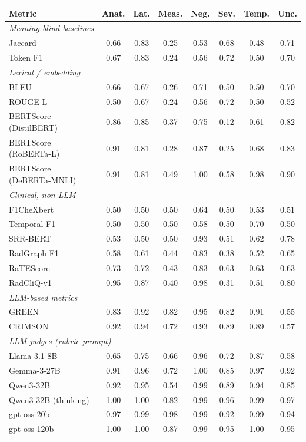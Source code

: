 \begin{tabular}{lccccccc}
\toprule
\textbf{Metric} & Anat. & Lat. & Meas. & Neg. & Sev. & Temp. & Unc. \\
\midrule
\multicolumn{8}{l}{\textit{Meaning-blind baselines}} \\
Jaccard & 0.66 & 0.83 & 0.25 & 0.53 & 0.68 & 0.48 & 0.71 \\
Token F1 & 0.67 & 0.83 & 0.24 & 0.56 & 0.72 & 0.50 & 0.70 \\
\multicolumn{8}{l}{\textit{Lexical / embedding}} \\
BLEU & 0.66 & 0.67 & 0.26 & 0.71 & 0.50 & 0.50 & 0.70 \\
ROUGE-L & 0.50 & 0.67 & 0.24 & 0.56 & 0.72 & 0.50 & 0.52 \\
BERTScore (DistilBERT) & 0.86 & 0.85 & 0.37 & 0.75 & 0.12 & 0.61 & 0.82 \\
BERTScore (RoBERTa-L) & 0.91 & 0.81 & 0.28 & 0.87 & 0.25 & 0.68 & 0.83 \\
BERTScore (DeBERTa-MNLI) & 0.91 & 0.81 & 0.49 & 1.00 & 0.58 & 0.98 & 0.90 \\
\multicolumn{8}{l}{\textit{Clinical, non-LLM}} \\
F1CheXbert & 0.50 & 0.50 & 0.50 & 0.64 & 0.50 & 0.53 & 0.51 \\
Temporal F1 & 0.50 & 0.50 & 0.50 & 0.58 & 0.50 & 0.70 & 0.50 \\
SRR-BERT & 0.53 & 0.50 & 0.50 & 0.93 & 0.51 & 0.62 & 0.78 \\
RadGraph F1 & 0.58 & 0.61 & 0.44 & 0.83 & 0.38 & 0.52 & 0.65 \\
RaTEScore & 0.73 & 0.72 & 0.43 & 0.83 & 0.63 & 0.63 & 0.63 \\
RadCliQ-v1 & 0.95 & 0.87 & 0.40 & 0.98 & 0.31 & 0.51 & 0.80 \\
\multicolumn{8}{l}{\textit{LLM-based metrics}} \\
GREEN & 0.83 & 0.92 & 0.82 & 0.95 & 0.82 & 0.91 & 0.55 \\
CRIMSON & 0.92 & 0.94 & 0.72 & 0.93 & 0.89 & 0.89 & 0.57 \\
\multicolumn{8}{l}{\textit{LLM judges (rubric prompt)}} \\
Llama-3.1-8B & 0.65 & 0.75 & 0.66 & 0.96 & 0.72 & 0.87 & 0.58 \\
Gemma-3-27B & 0.91 & 0.96 & 0.72 & 1.00 & 0.85 & 0.97 & 0.92 \\
Qwen3-32B & 0.92 & 0.95 & 0.54 & 0.99 & 0.89 & 0.94 & 0.85 \\
Qwen3-32B (thinking) & 1.00 & 1.00 & 0.82 & 0.99 & 0.96 & 0.99 & 0.97 \\
gpt-oss-20b & 0.97 & 0.99 & 0.98 & 0.99 & 0.92 & 0.99 & 0.94 \\
gpt-oss-120b & 1.00 & 1.00 & 0.87 & 0.99 & 0.95 & 1.00 & 0.95 \\
\bottomrule
\end{tabular}